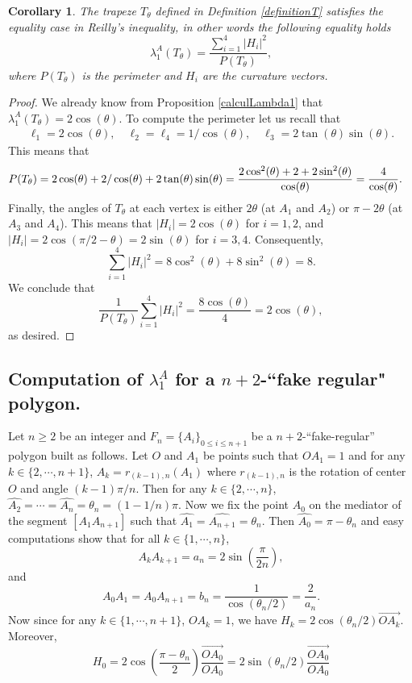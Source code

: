 \documentclass[12pt,english]{smfart} %
\newtheorem{corollary}[theorem]{Corollary}
\theoremstyle{remark}
\begin{document}
\medskip\begin{corollary} The trapeze $T_\theta$   defined in Definition \ref{definitionT} satisfies the equality case in Reilly's inequality, in other words the following equality holds
$$\lambda_1^A(T_\theta)=\frac{\sum_{i=1}^4|H_i|^2}{P(T_\theta)},$$
where $P(T_\theta)$ is the perimeter and $H_i$ are the curvature vectors. 
\end{corollary}

\begin{proof} We already know from Proposition \ref{calculLambda1} that $\lambda_1^A(T_\theta)=2\cos(\theta)$.  To compute the perimeter let us recall that
\begin{align*}
    \ell_1= 2\cos(\theta), \quad   \ell_2=\ell_4=1/\cos(\theta), \quad
\ell_3= 2\tan(\theta)\sin(\theta).
\end{align*}
This means that 
\begin{align*}
    P(T_\theta)&=2\cos(\theta) +  2/\cos(\theta) +2\tan(\theta)\sin(\theta) \notag = \frac{2\cos^2(\theta) +  2 +2 \sin^2(\theta)}{\cos(\theta)} = \frac{4}{\cos(\theta)}.
\end{align*}
Finally, the angles of $T_\theta$ at each vertex is either  $2\theta$ (at $A_1$ and $A_2$) or $\pi-2\theta$ (at $A_3$ and $A_4$). This means that $|H_i|= 2\cos(\theta)$ for $i=1,2$, and $|H_i|=2\cos(\pi/2-\theta)=2\sin(\theta)$ for $i=3,4$. Consequently,
$$\sum_{i=1}^4 |H_i|^2=8 \cos^2(\theta) + 8\sin^2(\theta)=8.$$
We conclude that 
$$\frac{1}{P(T_\theta)}\displaystyle\sum_{i=1}^4|H_i|^2=\frac{8\cos(\theta)}{4}=2\cos(\theta),$$
as desired.
\end{proof} 
   
 
 

\subsection{Computation of $\lambda_1^A$ for a $n+2$-``fake regular" polygon.}
\label{fakeregular}
Let $n\geqslant2$ be an integer and $F_n=\{A_i\}_{0\leqslant i\leqslant n+1}$ be a $n+2$-``fake-regular'' polygon built as follows. Let $O$ and $A_1$ be points such that $OA_1=1$ and for any $k\in\{2,\cdots,n+1\}$, $A_k=r_{(k-1),n}(A_1)$ where $r_{(k-1),n}$ is the rotation of center $O$ and angle $(k-1)\pi/n$. Then for any $k\in\{2,\cdots,n\}$, $\widehat{A_2}=\cdots=\widehat{A_n}=\theta_n=\left(1-1/n\right)\pi$. Now we fix the point $A_0$ on the mediator of the segment $[A_1A_{n+1}]$ such that $\widehat{A_1}=\widehat{A_{n+1}}=\theta_n$. Then $\widehat{A_0}=\pi-\theta_n$ and easy computations show that for all $k\in\{1,\cdots,n\}$,
$$A_kA_{k+1}=a_n=2\sin\left(\dfrac{\pi}{2n}\right),$$
and
$$A_0A_1=A_0A_{n+1}=b_n=\dfrac{1}{\cos\left(\theta_n/2\right)}=\dfrac{2}{a_n}.$$
Now since for any $k\in\{1,\cdots,n+1\}$, $OA_k=1$, we have $H_k=2\cos\left(\theta_n/2\right)\overrightarrow{OA_k}.$ Moreover,
$$H_0=2\cos\left(\dfrac{\pi-\theta_n}{2}\right)\frac{\overrightarrow{OA_0}}{OA_0}=2\sin\left(\theta_n/2\right)\frac{\overrightarrow{OA_0}}{OA_0}$$
\end{document}
